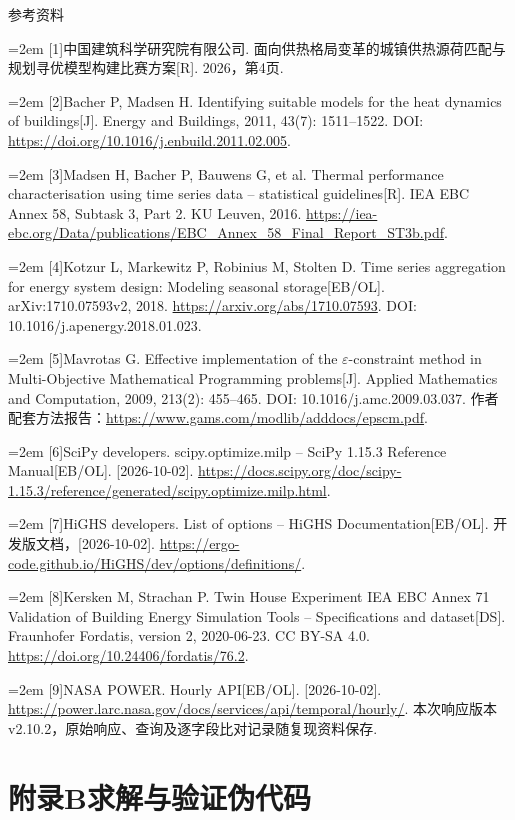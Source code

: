 \documentclass[12pt,a4paper]{article}
\newcommand{\heiti}{\headingfont}
\newcommand{\sihao}{\fontsize{14pt}{14pt}\selectfont}
\newenvironment{refsectionflush}
  {\par\sloppy\setlength{\parindent}{0pt}\setlength{\parskip}{0pt}}
  {\par\fussy}
\newcommand{\refentry}[2]{%
  \par\noindent\hangindent=2em\hangafter=1
  [#1]\enspace #2\par}
\begin{document}
\clearpage
\begin{center}{\heiti\sihao 参考资料}\end{center}
\begin{refsectionflush}
\refentry{1}{中国建筑科学研究院有限公司. 面向供热格局变革的城镇供热源荷匹配与规划寻优模型构建比赛方案{[}R{]}. 2026，第4页.}
\refentry{2}{Bacher P, Madsen H. Identifying suitable models for the heat dynamics of buildings{[}J{]}. Energy and Buildings, 2011, 43(7): 1511--1522. DOI: \url{https://doi.org/10.1016/j.enbuild.2011.02.005}.}
\refentry{3}{Madsen H, Bacher P, Bauwens G, et al. Thermal performance characterisation using time series data -- statistical guidelines{[}R{]}. IEA EBC Annex 58, Subtask 3, Part 2. KU Leuven, 2016. \url{https://iea-ebc.org/Data/publications/EBC_Annex_58_Final_Report_ST3b.pdf}.}
\refentry{4}{Kotzur L, Markewitz P, Robinius M, Stolten D. Time series aggregation for energy system design: Modeling seasonal storage{[}EB/OL{]}. arXiv:1710.07593v2, 2018. \url{https://arxiv.org/abs/1710.07593}. DOI: 10.1016/j.apenergy.2018.01.023.}
\refentry{5}{Mavrotas G. Effective implementation of the $\varepsilon$-constraint method in Multi-Objective Mathematical Programming problems{[}J{]}. Applied Mathematics and Computation, 2009, 213(2): 455--465. DOI: 10.1016/j.amc.2009.03.037. 作者配套方法报告：\url{https://www.gams.com/modlib/adddocs/epscm.pdf}.}
\refentry{6}{SciPy developers. scipy.optimize.milp -- SciPy 1.15.3 Reference Manual{[}EB/OL{]}. [2026-10-02]. \url{https://docs.scipy.org/doc/scipy-1.15.3/reference/generated/scipy.optimize.milp.html}.}
\refentry{7}{HiGHS developers. List of options -- HiGHS Documentation{[}EB/OL{]}. 开发版文档，[2026-10-02]. \url{https://ergo-code.github.io/HiGHS/dev/options/definitions/}.}
\refentry{8}{Kersken M, Strachan P. Twin House Experiment IEA EBC Annex 71 Validation of Building Energy Simulation Tools -- Specifications and dataset{[}DS{]}. Fraunhofer Fordatis, version 2, 2020-06-23. CC BY-SA 4.0. \url{https://doi.org/10.24406/fordatis/76.2}.}
\refentry{9}{NASA POWER. Hourly API{[}EB/OL{]}. [2026-10-02]. \url{https://power.larc.nasa.gov/docs/services/api/temporal/hourly/}. 本次响应版本v2.10.2，原始响应、查询及逐字段比对记录随复现资料保存.}
\end{refsectionflush}



\clearpage
\section*{附录B\quad 求解与验证伪代码}\label{ux9644ux5f55-a-ux4e09ux573aux666fux63a8ux8350ux914dux7f6eux6a21ux677f}
\end{document}
